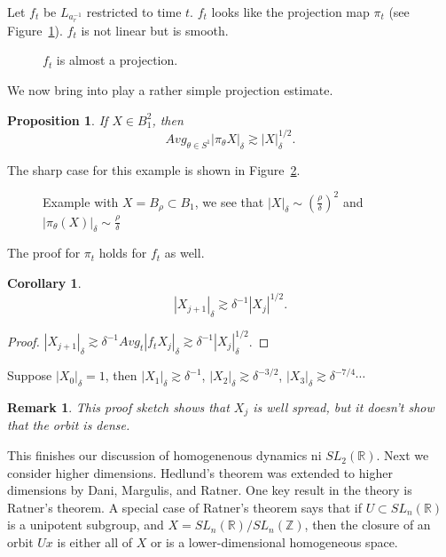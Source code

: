 \documentclass[12pt]{amsart}
\newtheorem{remark}[theorem]{Remark}
\newtheorem{prop}[theorem]{Proposition}
\newtheorem{corollary}[theorem]{Corollary}
\newcommand{\ZZ}{\mathbb{Z}}
\newcommand{\RR}{\mathbb{R}}
\begin{document}
Let $f_t$ be $L_{a_r^{-1}}$ restricted to time $t$. $f_t$ looks like the projection map $\pi_t$ (see Figure~\ref{fig:almost-a-projection}). $f_t$ is not linear but is smooth.
\begin{figure}[h!]
    \centering
    
    \caption{$f_t$ is almost a projection.}
    \label{fig:almost-a-projection}
\end{figure}

We now bring into play a rather simple projection estimate.   
\begin{prop}
    If $X \in B_1^2$, then 
    $$Avg_{\theta \in S^1}|\pi_\theta X|_\delta\gtrsim |X|_\delta^{1/2}.$$
\end{prop}
The sharp case for this example is shown in Figure~\ref{fig:projexamples}.
\begin{figure}[h!]
    \centering
    
    \caption{Example with $X = B_\rho \subset B_1$, we see that $|X|_\delta \sim (\frac{\rho}{\delta})^2$ and $|\pi_\theta (X)|_\delta \sim \frac{\rho}{\delta}$}
    \label{fig:projexamples}
\end{figure}


The proof for $\pi_t$ holds for $f_t$ as well. 
\begin{corollary}
    $$|X_{j+1}|_\delta \gtrsim \delta^{-1}|X_j|^{1/2}.$$
\end{corollary}
\begin{proof}
    $|X_{j+1}|_\delta \gtrsim \delta^{-1}Avg_t|f_t X_j|_\delta \gtrsim \delta^{-1}|X_j|_\delta^{1/2}$. 
\end{proof}
Suppose $|X_0|_\delta=1$, then $|X_1|_\delta\gtrsim \delta^{-1}$, $|X_2|_\delta\gtrsim \delta^{-3/2}$, $|X_3|_\delta\gtrsim \delta^{-7/4}\cdots$
\begin{remark}
    This proof sketch shows that $X_j$ is well spread, but it doesn't show that the orbit is dense. 
\end{remark}

This finishes our discussion of homogenenous dynamics ni $SL_2(\RR)$.   Next we consider higher dimensions.   Hedlund's theorem was extended to higher dimensions by Dani,  Margulis, and Ratner.   One key result in the theory is Ratner's theorem.  A special case of Ratner's theorem says that if $U \subset SL_n(\RR)$ is a unipotent subgroup,  and $X = SL_n(\RR) / SL_n(\ZZ)$,  then the closure of an orbit $Ux$ is either all of $X$ or is a lower-dimensional homogeneous space.   
\end{document}
